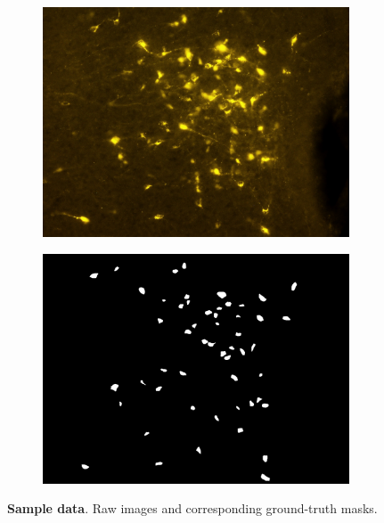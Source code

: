 \begin{figure}
\begin{subfigure}{0.5\textwidth}
\includegraphics[width=\linewidth]{figures/120_dataset/i_257.jpeg}
\label{fig:dataset:bright}
\end{subfigure}
\begin{subfigure}{0.5\textwidth}
\includegraphics[width=\linewidth]{figures/120_dataset/m_257.png}
\label{fig:dataset:bright_mask}
\end{subfigure}
\caption{
\textbf{Sample data}. 
Raw images and corresponding ground-truth masks.
} \label{fig:dataset}
\end{figure}%
